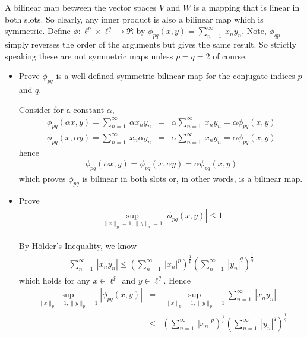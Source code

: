 \documentclass[11pt]{SelfArxOneColBMN}
\begin{document}
\begin{exercise}
  A bilinear map between the vector spaces $V$ and $W$ is a mapping that is linear in both slots. So clearly, any inner product is also a bilinear map which is symmetric. Define $\phi: \ell^p \times \ell^q \rightarrow \Re$ by $\phi_{pq}(x,y) = \sum_{n = 1}^\infty\:x_ny_n$. Note, $\phi_{qp}$ simply reverses the order of the arguments but gives the same result. So strictly speaking these are not symmetric maps unless $p = q = 2$ of course.
  \begin{itemize}
    \item Prove $\phi_{pq}$ is a well defined symmetric bilinear map for the conjugate indices $p$ and $q$.
    \begin{solution}
      Consider for a constant $\alpha$,
      \begin{eqnarray*}
        \phi_{pq}(\alpha x,y) = \sum_{n=1}^\infty\:\alpha x_ny_n &=& \alpha \sum_{n=1}^\infty\:x_ny_n = \alpha \phi_{pq}(x,y)\\
        \phi_{pq}(x,\alpha y) = \sum_{n=1}^\infty\:x_n\alpha y_n &=& \alpha \sum_{n=1}^\infty\:x_ny_n = \alpha \phi_{pq}(x,y)
      \end{eqnarray*}
      hence
      \begin{eqnarray*}
        \phi_{pq}(\alpha x,y) = \phi_{pq}(x,\alpha y) = \alpha\phi_{pq}(x,y)
      \end{eqnarray*}
      which proves $\phi_{pq}$ is bilinear in both slots or, in other words, is a bilinear map. 
    \end{solution}
    \item Prove 
    \begin{eqnarray*}
      \sup_{\|x\|_p=1,\|y\|_p=1}|\phi_{pq}(x,y)| \leq 1
    \end{eqnarray*}
    \begin{solution}
      By H\"older's Inequality, we know
      \begin{eqnarray*}
        \sum_{n=1}^\infty\:|x_ny_n| \leq (\sum_{n=1}^\infty\:|x_n|^p)^\frac{1}{p}(\sum_{n=1}^\infty\:|y_n|^q)^\frac{1}{q}
      \end{eqnarray*}
      which holds for any $x \in \ell^p$ and $y \in \ell^q$. Hence
      \begin{eqnarray*}
        \sup_{\|x\|_p=1,\|y\|_p=1}|\phi_{pq}(x,y)| &=& \sup_{\|x\|_p=1,\|y\|_p=1}\sum_{n=1}^\infty\:|x_ny_n|\\
        &\leq& (\sum_{n=1}^\infty\:|x_n|^p)^\frac{1}{p}(\sum_{n=1}^\infty\:|y_n|^q)^\frac{1}{q}\\

\end{eqnarray*}
\end{solution}
\end{itemize}
\end{exercise}
\end{document}

